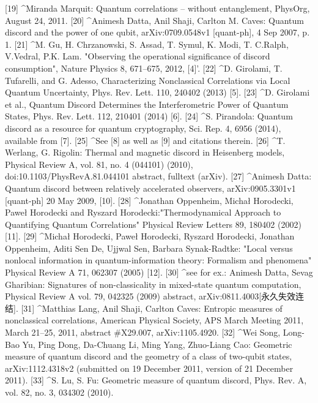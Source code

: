 [19]
^Miranda Marquit: Quantum correlations – without entanglement, PhysOrg, August 24, 2011.
[20]
^Animesh Datta, Anil Shaji, Carlton M. Caves: Quantum discord and the power of one qubit, arXiv:0709.0548v1 [quant-ph], 4 Sep 2007, p. 1.
[21]
^M. Gu, H. Chrzanowski, S. Assad, T. Symul, K. Modi, T. C.Ralph, V.Vedral, P.K. Lam. "Observing the operational significance of discord consumption", Nature Physics 8, 671–675, 2012, [4]'.
[22]
^D. Girolami, T. Tufarelli, and G. Adesso, Characterizing Nonclassical Correlations via Local Quantum Uncertainty, Phys. Rev. Lett. 110, 240402 (2013) [5].
[23]
^D. Girolami et al., Quantum Discord Determines the Interferometric Power of Quantum States, Phys. Rev. Lett. 112, 210401 (2014) [6].
[24]
^S. Pirandola: Quantum discord as a resource for quantum cryptography, Sci. Rep. 4, 6956 (2014), available from [7].
[25]
^See [8] as well as [9] and citations therein.
[26]
^T. Werlang, G. Rigolin: Thermal and magnetic discord in Heisenberg models, Physical Review A, vol. 81, no. 4 (044101) (2010), doi:10.1103/PhysRevA.81.044101 abstract, fulltext (arXiv).
[27]
^Animesh Datta: Quantum discord between relatively accelerated observers, arXiv:0905.3301v1 [quant-ph] 20 May 2009, [10].
[28]
^Jonathan Oppenheim, Michał Horodecki, Paweł Horodecki and Ryszard Horodecki:"Thermodynamical Approach to Quantifying Quantum Correlations" Physical Review Letters 89, 180402 (2002) [11].
[29]
^Michał Horodecki, Paweł Horodecki, Ryszard Horodecki, Jonathan Oppenheim, Aditi Sen De, Ujjwal Sen, Barbara Synak-Radtke: "Local versus nonlocal information in quantum-information theory: Formalism and phenomena" Physical Review A 71, 062307 (2005) [12].
[30]
^see for ex.: Animesh Datta, Sevag Gharibian: Signatures of non-classicality in mixed-state quantum computation, Physical Review A vol. 79, 042325 (2009) abstract, arXiv:0811.4003[永久失效连结].
[31]
^Matthias Lang, Anil Shaji, Carlton Caves: Entropic measures of nonclassical correlations, American Physical Society, APS March Meeting 2011, March 21–25, 2011, abstract #X29.007, arXiv:1105.4920.
[32]
^Wei Song, Long-Bao Yu, Ping Dong, Da-Chuang Li, Ming Yang, Zhuo-Liang Cao: Geometric measure of quantum discord and the geometry of a class of two-qubit states, arXiv:1112.4318v2 (submitted on 19 December 2011, version of 21 December 2011).
[33]
^S. Lu, S. Fu: Geometric measure of quantum discord, Phys. Rev. A, vol. 82, no. 3, 034302 (2010).